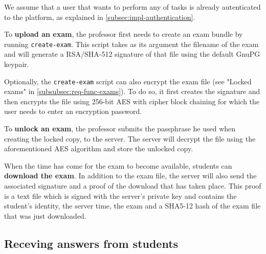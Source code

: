 \documentclass[12pt]{article}
\begin{document}

We assume that a user that wants to perform any of tasks is already autenticated
to the platform, as explained in \autoref{subsec:impl-authentication}.

To \textbf{upload an exam}, the professor first needs to create an exam bundle
by running \texttt{create-exam}. This script takes as its argument the filename
of the exam and will generate a RSA/SHA-512\footnotemark{} signature of that file
using the default GnuPG keypair.


Optionally, the \texttt{create-exam} script can also encrypt the exam file (see
"Locked exams" in \autoref{subsubsec:req-func-exams}). To do so, it first
creates the signature and then encrypts the file using 256-bit AES with cipher
block chaining for which the user needs to enter an encryption password.

To \textbf{unlock an exam}, the professor submits the passphrase he used when
creating the locked copy, to the server. The server will decrypt the file using
the aforementioned AES algorithm and store the unlocked copy.

When the time has come for the exam to become available, students can
\textbf{download the exam}. In addition to the exam file, the server will also
send the associated signature and a proof of the download that has taken place.
This proof is a text file which is signed with the server's private key and
contains the student's identity, the server time, the exam and a SHA5-12 hash
of the exam file that was just downloaded.

\subsection{Receving answers from students}
\label{subsec:impl-answers}

\end{document}
